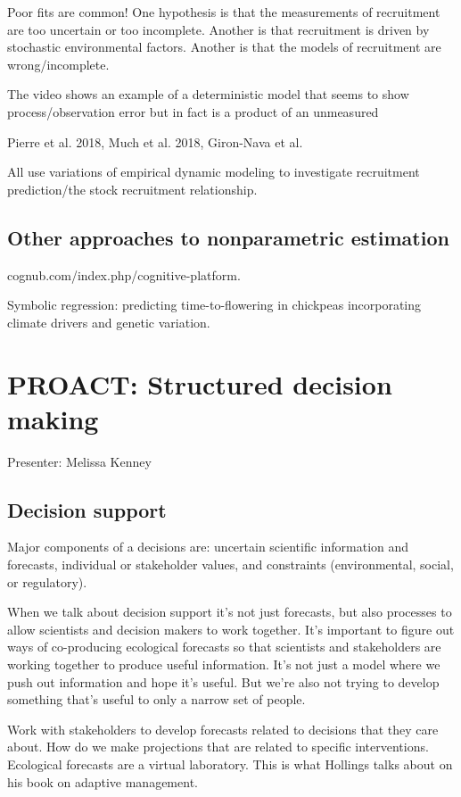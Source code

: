 \documentclass[12pt, oneside]{article}   	%
\begin{document}
Poor fits are common! One hypothesis is that the measurements of recruitment are too uncertain or too incomplete. Another is that recruitment is driven by stochastic environmental factors. Another is that the models of recruitment are wrong/incomplete. 

The video shows an example of a deterministic model that seems to show process/observation error but in fact is a product of an unmeasured 

Pierre et al. 2018, Much et al. 2018, Giron-Nava et al.

All use variations of empirical dynamic modeling to investigate recruitment prediction/the stock recruitment relationship.

\subsection{Other approaches to nonparametric estimation}

cognub.com/index.php/cognitive-platform.

Symbolic regression: predicting time-to-flowering in chickpeas incorporating climate drivers and genetic variation.

\section{PROACT: Structured decision making}

Presenter: Melissa Kenney

\subsection{Decision support}

Major components of a decisions are: uncertain scientific information and forecasts, individual or stakeholder values, and constraints (environmental, social, or regulatory).

When we talk about decision support it's not just forecasts, but also processes to allow scientists and decision makers to work together. It's important to figure out ways of co-producing ecological forecasts so that scientists and stakeholders are working together to produce useful information. It's not just a model where we push out information and hope it's useful. But we're also not trying to develop something that's useful to only a narrow set of people.

Work with stakeholders to develop forecasts related to decisions that they care about. How do we make projections that are related to specific interventions. Ecological forecasts are a virtual laboratory. This is what Hollings talks about on his book on adaptive management. 
\end{document}
